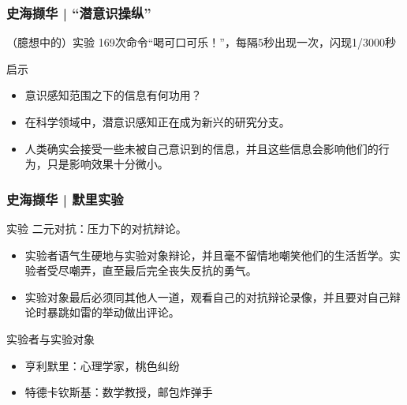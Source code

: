 \begin{frame}
  \frametitle{史海撷华 | “潜意识操纵”}
  \begin{block}{（臆想中的）实验}
    169次命令“喝可口可乐！”，每隔5秒出现一次，闪现1/3000秒
  \end{block}
  \pause
  \begin{block}{启示}
    \begin{itemize}
      \item 意识感知范围之下的信息有何功用？
      \item 在科学领域中，潜意识感知正在成为新兴的研究分支。
      \item 人类确实会接受一些未被自己意识到的信息，并且这些信息会影响他们的行为，只是影响效果十分微小。
    \end{itemize}
  \end{block}
\end{frame}

\begin{frame}
  \frametitle{史海撷华 | 默里实验}
  \begin{block}{实验}
    二元对抗：压力下的对抗辩论。
    \begin{itemize}
      \item 实验者语气生硬地与实验对象辩论，并且毫不留情地嘲笑他们的生活哲学。实验者受尽嘲弄，直至最后完全丧失反抗的勇气。
      \item 实验对象最后必须同其他人一道，观看自己的对抗辩论录像，并且要对自己辩论时暴跳如雷的举动做出评论。
    \end{itemize}
  \end{block}
  \pause
  \begin{block}{实验者与实验对象}
    \begin{itemize}
      \item 亨利\textbullet 默里：心理学家，桃色纠纷
      \item 特德\textbullet 卡钦斯基：数学教授，邮包炸弹手
    \end{itemize}
  \end{block}
\end{frame}

